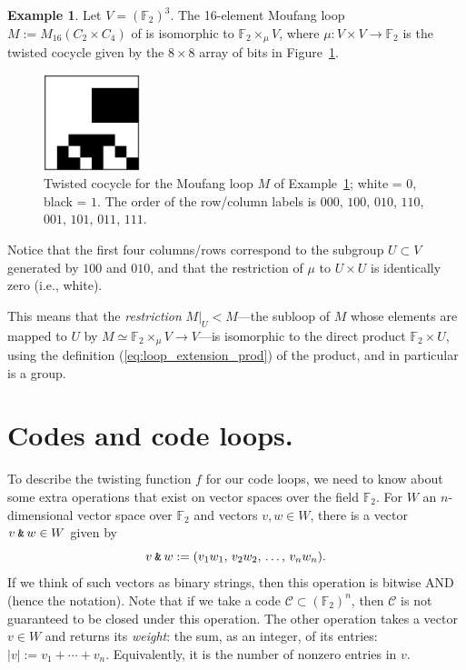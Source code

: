 \documentclass{article}
\theoremstyle{plain}
\theoremstyle{definition}
\newtheorem{example}{Example}
\def \cC {\mathcal{C}}
\def \FF {\mathbb{F}}
\newcommand{\AND}{\mathbin{\textup{\texttt{\&}}}}
\begin{document}
\begin{example}\label{example:m16}
Let $V= (\FF_2)^3$. The 16-element Moufang loop $M := M_{16}(C_2\times C_4)$ of \cite[Theorem 2]{Chein} is isomorphic to $\FF_2 \times_\mu V$,  where  $\mu\colon V\times V\to\FF_2$  is the twisted cocycle given by the $8\times 8$ array of bits in Figure~\ref{fig:cocycle for M}.
\medskip
\begin{figure}[!ht]
\begin{center}
\includegraphics[width=0.25\textwidth]{m16}
\end{center}
\caption{Twisted cocycle for the Moufang loop $M$ of Example~\ref{example:m16}; white = $0$, black = $1$. The order of the row/column labels is $000$, $100$, $010$, $110$, $001$, $101$, $011$, $111$. }\label{fig:cocycle for M}
\end{figure}


Notice that the first four columns/rows correspond to the subgroup $U\subset V$ generated by $100$ and $010$, and that the restriction of $\mu$ to $U\times U$ is identically zero (i.e., white). 

This means that the \emph{restriction} $M\big|_U < M$---the subloop of $M$ whose elements are mapped to $U$ by $M \simeq \FF_2\times_\mu V \to V$---is isomorphic to the direct product $\FF_2\times U$, using the definition (\ref{eq:loop_extension_prod}) of the product, and in particular is a group.


\end{example}


\section{Codes and code loops.}

To describe the twisting function $f$ for our code loops, we need to know about some extra operations that exist on vector spaces over the field $\FF_2$. 
For $W$ an $n$-dimensional vector space over $\FF_2$ and vectors $v,w\in W$, there is a vector $v\AND w \in W$ given by
\[
	v\AND w := (v_1w_1,\,v_2w_2,\,\ldots,\,v_nw_n).
\]
If we think of such vectors as binary strings, then this operation is bitwise AND (hence the notation). 
Note that if we take a code $\cC \subset (\FF_2)^n$, then $\cC$ is not guaranteed to be closed under this operation.
The other operation takes a vector $v\in W$ and returns its \emph{weight}: the sum, as an integer, of its entries: $|v| := v_1 + \cdots + v_n$. 
Equivalently, it is the number of nonzero entries in $v$.
\end{document}
